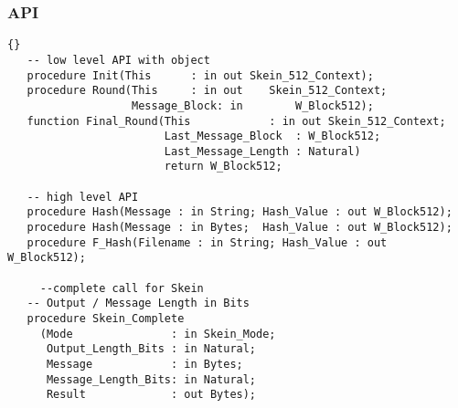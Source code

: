 \subsubsection*{API}
\begin{lstlisting}{}
   -- low level API with object
   procedure Init(This 		: in out Skein_512_Context);
   procedure Round(This 	: in out 	Skein_512_Context;
                   Message_Block: in 		W_Block512);
   function Final_Round(This 		    : in out Skein_512_Context;
                        Last_Message_Block  : W_Block512;
                        Last_Message_Length : Natural)
                        return W_Block512;
												
   -- high level API
   procedure Hash(Message : in String; Hash_Value : out W_Block512);
   procedure Hash(Message : in Bytes;  Hash_Value : out W_Block512);
   procedure F_Hash(Filename : in String; Hash_Value : out W_Block512);
	
	 --complete call for Skein
   -- Output / Message Length in Bits
   procedure Skein_Complete
     (Mode           	 : in Skein_Mode;
      Output_Length_Bits : in Natural;
      Message        	 : in Bytes;
      Message_Length_Bits: in Natural;
      Result         	 : out Bytes);
\end{lstlisting}
			

